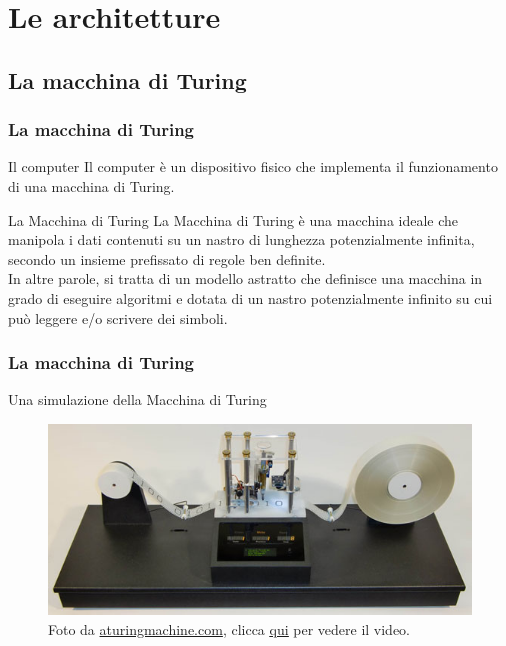 \section[Le architetture]{Le architetture}
\label{sec:architectures}


\subsection[La macchina di Turing]{La macchina di Turing}
\begin{frame}
	\frametitle{La macchina di Turing}
	 
	\begin{block}{Il computer}
		Il computer è un dispositivo fisico che implementa il funzionamento di una macchina di Turing.
	\end{block}
	\begin{block}{La Macchina di Turing}
		La Macchina di Turing è una macchina ideale che manipola i dati contenuti su un nastro di lunghezza potenzialmente infinita, secondo un insieme prefissato di regole ben definite.\\
		In altre parole, si tratta di un modello astratto che definisce una macchina in grado di eseguire algoritmi e dotata di un nastro potenzialmente infinito su cui può leggere e/o scrivere dei simboli.
	\end{block}
\end{frame}



\begin{frame}
	\frametitle{La macchina di Turing}
	
	\begin{block}{Una simulazione della Macchina di Turing}
		\begin{figure}[!htbp]
			\centering 
			\includegraphics[width=0.9\linewidth]{images/2_le_architetture/turing_machine.jpg}
			\caption{Foto da \href{https://aturingmachine.com/}{aturingmachine.com}, clicca \underline{\href{https://www.youtube.com/watch?v=E3keLeMwfHY}{qui}} per vedere il video.}
			\label{fig:architectures_turingmachine}
		\end{figure}
	\end{block}
\end{frame}


